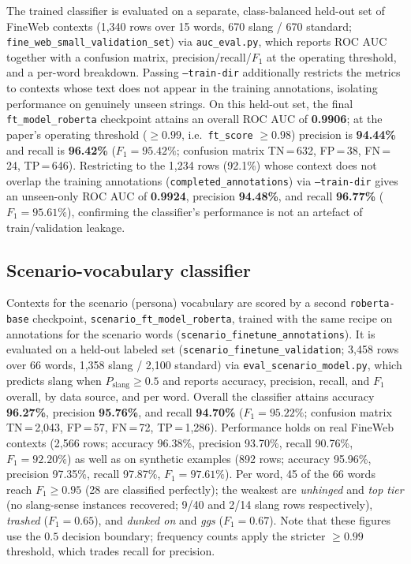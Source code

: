 \documentclass[11pt]{article}
\begin{document}
The trained classifier is evaluated on a separate, class-balanced held-out set of FineWeb contexts (1{,}340 rows over 15 words, 670 slang / 670 standard; \texttt{fine\_web\_small\_validation\_set}) via \texttt{auc\_eval.py}, which reports ROC AUC together with a confusion matrix, precision/recall/$F_1$ at the operating threshold, and a per-word breakdown. Passing \texttt{--train-dir} additionally restricts the metrics to contexts whose text does not appear in the training annotations, isolating performance on genuinely unseen strings. On this held-out set, the final \texttt{ft\_model\_roberta} checkpoint attains an overall ROC AUC of \textbf{0.9906}; at the paper's operating threshold ($\geq 0.99$, i.e.\ \texttt{ft\_score} $\geq 0.98$) precision is \textbf{94.44\%} and recall is \textbf{96.42\%} ($F_1 = 95.42\%$; confusion matrix TN\,=\,632, FP\,=\,38, FN\,=\,24, TP\,=\,646). Restricting to the 1{,}234 rows (92.1\%) whose context does not overlap the training annotations (\texttt{completed\_annotations}) via \texttt{--train-dir} gives an unseen-only ROC AUC of \textbf{0.9924}, precision \textbf{94.48\%}, and recall \textbf{96.77\%} ($F_1 = 95.61\%$), confirming the classifier's performance is not an artefact of train/validation leakage.

\subsection{Scenario-vocabulary classifier}

Contexts for the scenario (persona) vocabulary are scored by a second \texttt{roberta-base} checkpoint, \texttt{scenario\_ft\_model\_roberta}, trained with the same recipe on annotations for the scenario words (\texttt{scenario\_finetune\_annotations}). It is evaluated on a held-out labeled set (\texttt{scenario\_finetune\_validation}; 3{,}458 rows over 66 words, 1{,}358 slang / 2{,}100 standard) via \texttt{eval\_scenario\_model.py}, which predicts slang when $P_{\text{slang}} \geq 0.5$ and reports accuracy, precision, recall, and $F_1$ overall, by data source, and per word. Overall the classifier attains accuracy \textbf{96.27\%}, precision \textbf{95.76\%}, and recall \textbf{94.70\%} ($F_1 = 95.22\%$; confusion matrix TN\,=\,2{,}043, FP\,=\,57, FN\,=\,72, TP\,=\,1{,}286). Performance holds on real FineWeb contexts (2{,}566 rows; accuracy 96.38\%, precision 93.70\%, recall 90.76\%, $F_1 = 92.20\%$) as well as on synthetic examples (892 rows; accuracy 95.96\%, precision 97.35\%, recall 97.87\%, $F_1 = 97.61\%$). Per word, 45 of the 66 words reach $F_1 \geq 0.95$ (28 are classified perfectly); the weakest are \textit{unhinged} and \textit{top tier} (no slang-sense instances recovered; 9/40 and 2/14 slang rows respectively), \textit{trashed} ($F_1 = 0.65$), and \textit{dunked on} and \textit{ggs} ($F_1 = 0.67$). Note that these figures use the $0.5$ decision boundary; frequency counts apply the stricter $\geq 0.99$ threshold, which trades recall for precision.
\end{document}
